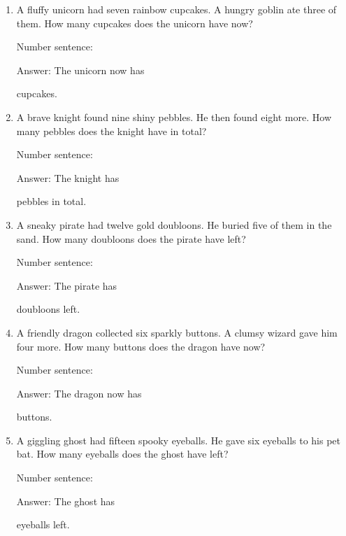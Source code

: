 \documentclass{tufte-book}
\begin{document}
\begin{enumerate}

\item
  A fluffy unicorn had seven rainbow cupcakes. A hungry goblin ate three
  of them. How many cupcakes does the unicorn have now?\medskip\par
  Number sentence:
  \dotfill\medskip\par
  Answer: The unicorn now has
  \dotfill\medskip\par\mbox{}\dotfill\medskip\par\mbox{}\dotfill\bigskip
  cupcakes.
\item
  A brave knight found nine shiny pebbles. He then found eight more. How
  many pebbles does the knight have in total?\medskip\par
  Number sentence:
  \dotfill\medskip\par
  Answer: The knight has
  \dotfill\medskip\par\mbox{}\dotfill\medskip\par\mbox{}\dotfill\bigskip
  pebbles in total.
\item
  A sneaky pirate had twelve gold doubloons. He buried five of them in
  the sand. How many doubloons does the pirate have left?\medskip\par
  Number sentence:
  \dotfill\medskip\par
  Answer: The pirate has
  \dotfill\medskip\par\mbox{}\dotfill\medskip\par\mbox{}\dotfill\bigskip
  doubloons left.
\item
  A friendly dragon collected six sparkly buttons. A clumsy wizard gave
  him four more. How many buttons does the dragon have now?\medskip\par
  Number sentence:
  \dotfill\medskip\par
  Answer: The dragon now has
  \dotfill\medskip\par\mbox{}\dotfill\medskip\par\mbox{}\dotfill\bigskip
  buttons.
\item
  A giggling ghost had fifteen spooky eyeballs. He gave six eyeballs to
  his pet bat. How many eyeballs does the ghost have left?\medskip\par
  Number sentence:
  \dotfill\medskip\par
  Answer: The ghost has
  \dotfill\medskip\par\mbox{}\dotfill\medskip\par\mbox{}\dotfill\bigskip
  eyeballs left.

\end{enumerate}
\end{document}

